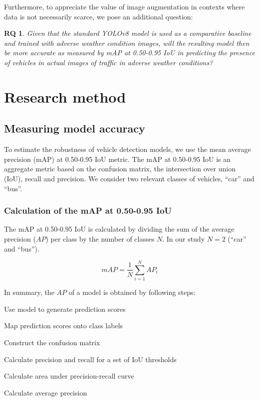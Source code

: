 \documentclass[]{article}
\newtheorem{researchquestion}{RQ}
\begin{document}
	Furthermore, to appreciate the value of image augmentation in contexts where data is not necessarily scarce, we pose an additional question:
	\begin{researchquestion}
		\label{rq2}
		Given that the standard YOLO{\small v8} model is used as a comparative baseline and trained with adverse weather condition images, will the resulting model then be more accurate as measured by mAP at 0.50-0.95 IoU in predicting the presence of vehicles in actual images of traffic in adverse weather conditions?
	\end{researchquestion}

\section{Research method}
\subsection{Measuring model accuracy}

	To estimate the robustness of vehicle detection models, we use the mean average precision (mAP) at 0.50-0.95 IoU metric. The mAP at 0.50-0.95 IoU is an aggregate metric based on the confusion matrix, the intersection over union (IoU), recall and precision. We consider two relevant classes of vehicles, ``car'' and ``bus''.

\subsubsection{Calculation of the mAP at 0.50-0.95 IoU}

	The mAP at 0.50-0.95 IoU is calculated by dividing the sum of the average precision ($AP$) per class by the number of classes $N$.  In our study $N = 2$ (``car'' and ``bus'').
	
	\[
	mAP = \frac{1}{N} \sum_{i=1}^{N} AP_i
	\]

	In summary, the $AP$ of a model is obtained by following steps:

	\begin{center}
		\begin{compactenum}
			\item Use model to generate prediction scores
			\item Map prediction scores onto class labels
			\item Construct the confusion matrix
			\item Calculate precision and recall for a set of IoU thresholds
			\item Calculate area under precision-recall curve
			\item Calculate average precision
		\end{compactenum}
	\end{center}
\end{document}
